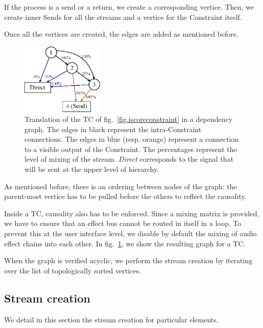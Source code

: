 \documentclass{article}
\newcommand*{\timeconstraint}{\ac{TC}\xspace}
\begin{document}
If the process is a send or a return, we create a corresponding vertice.
Then, we create inner Sends for all the streams and a vertice for the Constraint itself.

Once all the vertices are created, the edges are added as mentioned before.

\begin{figure}
	\centering
	\includegraphics[width=0.35\textwidth]{figures/graph1.eps}
	\caption{Translation of the \timeconstraint of fig.~\ref{fig.iscoreconstraint} in a dependency graph.
		The edges in black represent the intra-Constraint connections. 
		The edges in blue (resp. orange) represent a connection to a visible output of 
		the Constraint. The percentages represent the level of mixing of the stream.
		\textit{Direct} corresponds to the signal that will be sent at the upper level of hierarchy.}
	\label{fig.graph}
\end{figure}

As mentioned before, there is an ordering between nodes of the graph: the parent-most vertice
has to be pulled before the others to reflect the causality.


Inside a \timeconstraint, causality also has to be enforced. 
Since a mixing matrix is provided, we have to ensure that an effect bus cannot be routed in 
itself in a loop. 
To prevent this at the user interface level, we disable by default the mixing of audio effect chains into each other. In fig.~\ref{fig.graph}, we show the resulting graph for a \timeconstraint. 

When the graph is verified acyclic, we perform the stream creation by iterating over the list of topologically sorted vertices.

\subsection{Stream creation}
We detail in this section the stream creation for particular elements.
\end{document}
